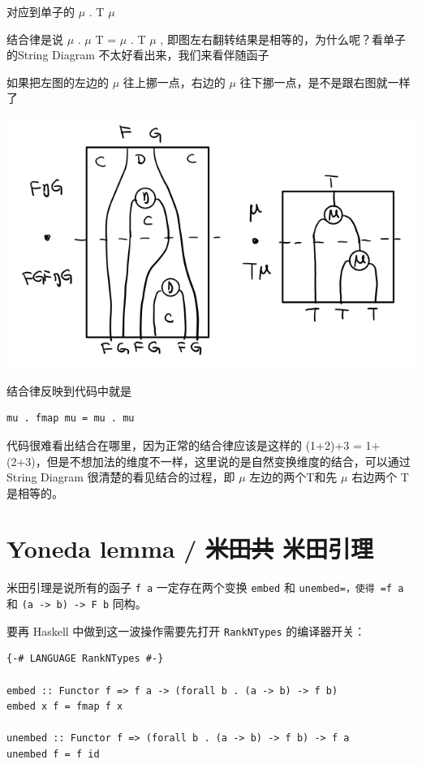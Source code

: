 \documentclass[letterspacing]{tufte-book}
\begin{document}
对应到单子的 \(\mu\) . T \(\mu\)

结合律是说 \(\mu\) . \(\mu\) T = \(\mu\) . T \(\mu\) , 即图左右翻转结果是相等的，为什么呢？看单子的String Diagram 不太好看出来，我们来看伴随函子

如果把左图的左边的 \(\mu\) 往上挪一点，右边的 \(\mu\) 往下挪一点，是不是跟右图就一样了
\begin{center}
\includegraphics[width=.9\linewidth]{images/p1-ajunction-functor-monad-laws-4.png}
\end{center}

结合律反映到代码中就是
\lstset{language=haskell,label= ,caption= ,captionpos=b,numbers=none}
\begin{lstlisting}
mu . fmap mu = mu . mu
\end{lstlisting}

代码很难看出结合在哪里，因为正常的结合律应该是这样的 (1+2)+3 = 1+(2+3)，但是不想加法的维度不一样，这里说的是自然变换维度的结合，可以通过String Diagram 很清楚的看见结合的过程，即 \(\mu\) 左边的两个T和先 \(\mu\) 右边两个 T 是相等的。

\chapter{Yoneda lemma / \sout{米田共} 米田引理}
\label{sec:orga68f251}

米田引理是说所有的函子 \texttt{f a} 一定存在两个变换 \texttt{embed} 和 \texttt{unembed=，使得 =f a} 和 \texttt{(a -> b) -> F b} 同构。

要再 Haskell 中做到这一波操作需要先打开 \texttt{RankNTypes} 的编译器开关：

\lstset{language=haskell,label= ,caption= ,captionpos=b,numbers=none}
\begin{lstlisting}
{-# LANGUAGE RankNTypes #-}

embed :: Functor f => f a -> (forall b . (a -> b) -> f b)
embed x f = fmap f x

unembed :: Functor f => (forall b . (a -> b) -> f b) -> f a
unembed f = f id
\end{lstlisting}
\end{document}
